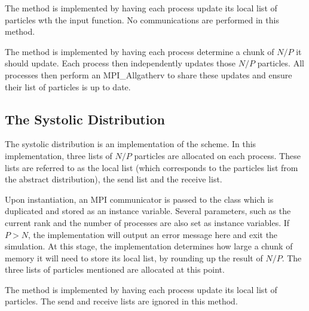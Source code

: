 The \individualoperation{} method is implemented by having each process update
its local list of particles wth the input function.
%
No communications are performed in this method.

The \pairoperation{} method is implemented by having each process
determine a chunk of $N/P$ it should update.
%
Each process then independently updates those $N/P$ particles.
%
All processes then perform an MPI\_Allgatherv to share these
updates and ensure their list of particles is up to date.


\subsection{The Systolic Distribution}

%
The systolic distribution is an implementation of the \systolicloop{} scheme.
%
In this implementation, three lists of $N/P$ particles are allocated
on each process.
%
These lists are referred to as the local list (which corresponds to
the particles list from the abstract distribution), the send list and the
receive list.

Upon instantiation, an MPI communicator is passed to the class
which is duplicated and stored as an instance variable.
%
Several parameters, such as the current rank and the number of
processes are also set as instance variables.
%
If $P > N$, the implementation will output an error message
here and exit the simulation.
%
At this stage, the implementation determines how large a chunk of
memory it will need to store its local list, by rounding up
the result of $N/P$.
%
The three lists of particles mentioned are allocated at this point.

The \individualoperation{} method is implemented by having each process
update its local list of particles.
%
The send and receive lists are ignored in this method.

